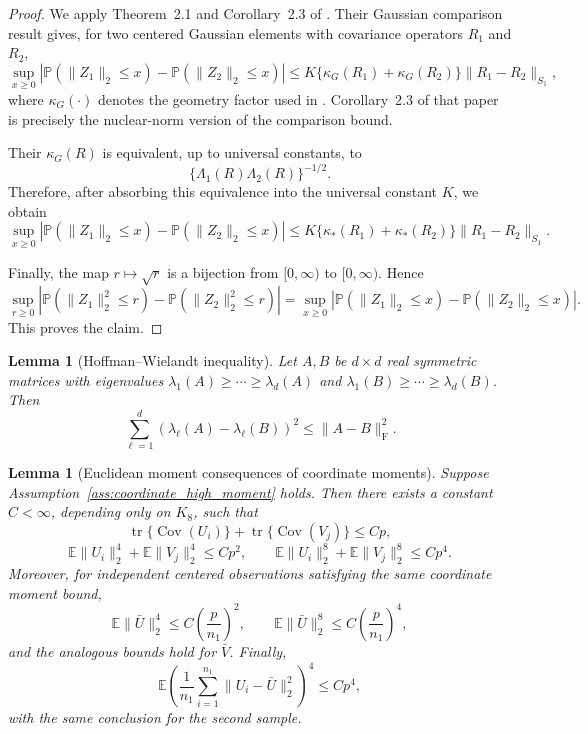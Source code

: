 \documentclass[
  12pt]{article}
\theoremstyle{plain}
\newtheorem{lemma}[theorem]{Lemma}
\theoremstyle{definition}
\theoremstyle{remark}
\begin{document}
\begin{proof}
We apply Theorem~2.1 and Corollary~2.3 of
\citet{gotze_large_2019}.  Their Gaussian comparison result gives, for two
centered Gaussian elements with covariance operators \(R_1\) and \(R_2\),
\[
\sup_{x\ge0}
\left|
\mathbb P(\|Z_1\|_2\le x)
-
\mathbb P(\|Z_2\|_2\le x)
\right|
\le
K
\{\kappa_G(R_1)+\kappa_G(R_2)\}
\|R_1-R_2\|_{S_1},
\]
where \(\kappa_G(\cdot)\) denotes the geometry factor used in
\citet{gotze_large_2019}.  Corollary~2.3 of that paper is precisely the
nuclear-norm version of the comparison bound.

Their \(\kappa_G(R)\) is equivalent, up to universal constants, to
\[
\{\Lambda_1(R)\Lambda_2(R)\}^{-1/2}.
\]
Therefore, after absorbing this equivalence into the universal constant \(K\),
we obtain
\[
\sup_{x\ge0}
\left|
\mathbb P(\|Z_1\|_2\le x)
-
\mathbb P(\|Z_2\|_2\le x)
\right|
\le
K
\{\kappa_*(R_1)+\kappa_*(R_2)\}
\|R_1-R_2\|_{S_1}.
\]

Finally, the map \(r\mapsto\sqrt r\) is a bijection from \([0,\infty)\) to
\([0,\infty)\).  Hence
\[
\sup_{r\ge0}
\left|
\mathbb P(\|Z_1\|_2^2\le r)
-
\mathbb P(\|Z_2\|_2^2\le r)
\right|
=
\sup_{x\ge0}
\left|
\mathbb P(\|Z_1\|_2\le x)
-
\mathbb P(\|Z_2\|_2\le x)
\right|.
\]
This proves the claim.
\end{proof}

\begin{lemma}[Hoffman--Wielandt inequality]
\label{lem:hoffman_wielandt}
Let \(A,B\) be \(d\times d\) real symmetric matrices with eigenvalues
\(\lambda_1(A)\ge\cdots\ge\lambda_d(A)\) and
\(\lambda_1(B)\ge\cdots\ge\lambda_d(B)\). Then
\[
\sum_{\ell=1}^d
(\lambda_\ell(A)-\lambda_\ell(B))^2
\le
\|A-B\|_{\mathrm F}^2.
\]
\end{lemma}

\begin{lemma}[Euclidean moment consequences of coordinate moments]
\label{lem:coordinate_moments_imply_euclidean}
Suppose Assumption~\ref{ass:coordinate_high_moment} holds.  Then there exists a
constant \(C<\infty\), depending only on \(K_8\), such that
\[
\operatorname{tr}\{\operatorname{Cov}(U_i)\}
+
\operatorname{tr}\{\operatorname{Cov}(V_j)\}
\le Cp,
\]
\[
\mathbb E\|U_i\|_2^4+\mathbb E\|V_j\|_2^4\le Cp^2,
\qquad
\mathbb E\|U_i\|_2^8+\mathbb E\|V_j\|_2^8\le Cp^4 .
\]
Moreover, for independent centered observations satisfying the same coordinate
moment bound,
\[
\mathbb E\|\bar U\|_2^4\le C\left(\frac p{n_1}\right)^2,
\qquad
\mathbb E\|\bar U\|_2^8\le C\left(\frac p{n_1}\right)^4,
\]
and the analogous bounds hold for \(\bar V\).  Finally,
\[
\mathbb E
\left(
\frac1{n_1}\sum_{i=1}^{n_1}\|U_i-\bar U\|_2^2
\right)^4
\le Cp^4,
\]
with the same conclusion for the second sample.
\end{lemma}
\end{document}
